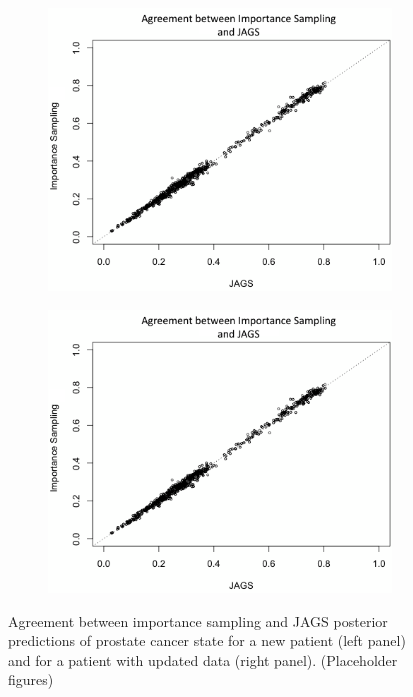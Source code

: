 \documentclass[12pt, letterpaper]{article}
\begin{document}
\begin{figure}
\begin{center}
\begin{subfigure}[b]{0.45\textwidth}
\includegraphics[width=\textwidth]{2015-07-01_compare_fits_manual-edit}
\end{subfigure}
\begin{subfigure}[b]{0.45\textwidth}
\includegraphics[width=\textwidth]{2015-07-01_compare_fits_manual-edit}
\end{subfigure}
\caption{Agreement between importance sampling and JAGS posterior predictions of prostate cancer state for a new patient (left panel) and for a patient with updated data (right panel). (Placeholder figures) }
\label{fig:jags-vs-pf}
\end{center}
\end{figure}
\end{document}
